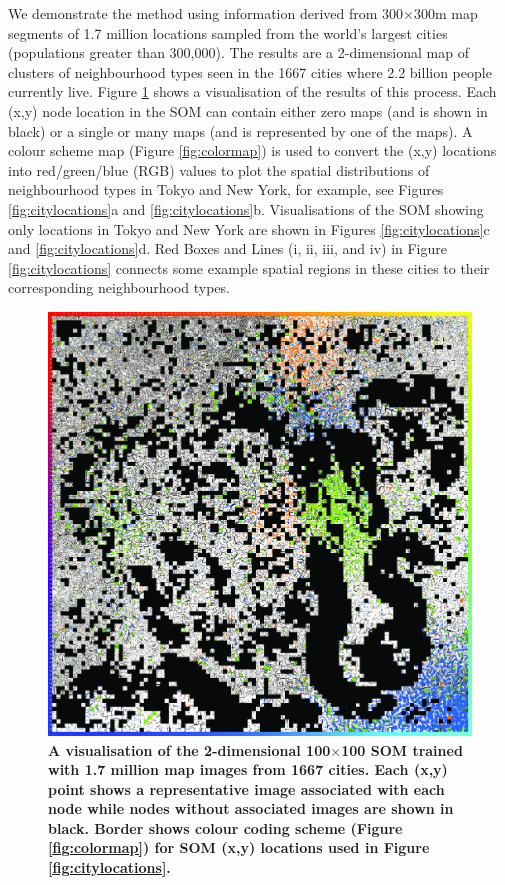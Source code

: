 \documentclass[9pt,twocolumn,twoside,lineno]{pnas-new}
\begin{document}
We demonstrate the method using information derived from 300$\times$300m map segments of 1.7 million locations sampled from the world's largest cities (populations greater than 300,000). The results are a 2-dimensional map of clusters of neighbourhood types seen in the 1667 cities where 2.2 billion people currently live. Figure \ref{fig:somresults} shows a visualisation of the results of this process. Each (x,y) node location in the SOM can contain either zero maps (and is shown in black) or a single or many maps (and is represented by one of the maps). A colour scheme map (Figure \ref{fig:colormap}) is used to convert the (x,y) locations into red/green/blue (RGB) values to plot the spatial distributions of neighbourhood types in Tokyo and New York, for example, see Figures \ref{fig:citylocations}a and \ref{fig:citylocations}b. Visualisations of the SOM showing only locations in Tokyo and New York are shown in Figures \ref{fig:citylocations}c and \ref{fig:citylocations}d. Red Boxes and Lines (i, ii, iii, and iv) in Figure \ref{fig:citylocations} connects some example spatial regions in these cities to their corresponding neighbourhood types.

\begin{figure}
\centering
\includegraphics[width=.5\linewidth]{BlockTypologies_Figures2-0.png}
\caption{\bf A visualisation of the 2-dimensional 100$\times$100 SOM trained with 1.7 million map images from 1667 cities. Each (x,y) point shows a representative image associated with each node while nodes without associated images are shown in black. Border shows colour coding scheme (Figure \ref{fig:colormap}) for SOM (x,y) locations used in Figure \ref{fig:citylocations}.}
 \label{fig:somresults}
\end{figure}
\end{document}
